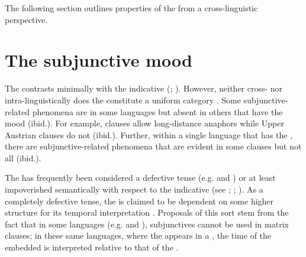 \documentclass[output=paper,modfonts,newtxmath,hidelinks,]{langscibook}
\begin{document}
\ea \label{10:ex18}
\z\z

\noindent The following section outlines properties of the  from a cross-linguistic perspective. 

\section{The subjunctive mood}\label{10:s3}

The  contrasts minimally with the indicative (\citealt[660]{Quer2006}; \citealt[218]{Wiltschko}). However, neither cross- nor intra-linguistically does the  constitute a uniform category \citep[661]{Quer2006}. Some subjunc\-tive-related phenomena are  in some languages but absent in others that have the mood (ibid.). For example,   clauses allow long-distance anaphors while Upper Austrian   clauses do not (ibid.). Further, within a single language that has the , there are sub\-junc\-tive-related phenomena that are evident in some  clauses but not all (ibid.).

The  has frequently been considered a defective tense (e.g. \citealt{Picallo1984} and \citealt{Giannakidou2009}) or at least impoverished semantically with respect to the indicative (see \citealt{Cowper2002}; \citealt{Cowper2005}; \citealt{Schlenker2005}). As a completely defective tense, the  is claimed to be dependent on some higher structure for its temporal interpretation \citep[2]{Wiltschko}. Proposals of this sort stem from the fact that in some languages (e.g.  and ), subjunctives cannot be used in matrix clauses; in these same languages, where the  appears in a , the time of the embedded  is interpreted relative to that of the  \citep{Wiltschko}.\largerpage[-1]
\end{document}
